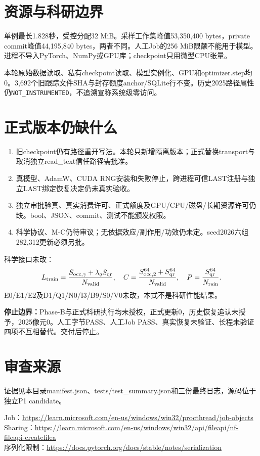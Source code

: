 \documentclass[UTF8,a4paper,10pt]{ctexart}
\begin{document}
\newpage
\section*{资源与科研边界}
单例最长1.828秒，受控分配32 MiB。采样工作集峰值53,350,400 bytes，private commit峰值44,195,840 bytes，两者不同。人工Job的256 MiB限额不能用于模型。进程不导入PyTorch、NumPy或GPU库；checkpoint只用微型CPU张量。

本轮原始数据读取、私有checkpoint读取、模型实例化、GPU和optimizer.step均0。3,692个旧跟踪文件SHA与封存额度anchor/SQLite行不变。历史2025路径属性仍\texttt{NOT\_INSTRUMENTED}，不追溯宣称系统级零访问。

\section*{正式版本仍缺什么}
\begin{enumerate}
\item 旧checkpoint仍有路径重开写法。本轮只新增隔离版本；正式替换transport与取消独立read\_text信任路径需批准。
\item 真模型、AdamW、CUDA RNG安装和失败停止，跨进程可信LAST注册与独立LAST绑定恢复决定仍未真实验收。
\item 独立审批验真、真实消费许可、正式额度及GPU/CPU/磁盘/长期资源许可仍缺。bool、JSON、commit、测试不能颁发权限。
\item 科学协议、M-C仍待审议；无依据效应/副作用/功效仍未定。seed2026六组282,312更新必须另批。
\end{enumerate}

科学接口未改：
\[
L_{\rm train}=\frac{S_{\rm occ,\gamma}+\lambda_q S_{\rm qr}}{N_{\rm valid}},\quad
C=\frac{S_{\rm occ,2}^{64}+S_{\rm qr}^{64}}{N_{\rm valid}},\quad
P=\frac{S_{\rm qr}^{64}}{N_{\rm rain}}.
\]
E0/E1/E2及D1/Q1/N0/I3/B9/S0/V0未改，本式不是科研性能结果。

\textbf{停止边界：}Phase-B与正式科研执行均未授权，正式更新0，历史恢复追认未授予，2025像元0。人工字节PASS、人工Job PASS、真实恢复未验证、长程未验证四项不互相替代。交付后停止。

\section*{审查来源}
证据见本目录manifest.json、tests/test\_summary.json和三份最终日志，源码位于独立P1 candidate。

{\footnotesize
Job：\url{https://learn.microsoft.com/en-us/windows/win32/procthread/job-objects}\\
Sharing：\url{https://learn.microsoft.com/en-us/windows/win32/api/fileapi/nf-fileapi-createfilea}\\
序列化限制：\url{https://docs.pytorch.org/docs/stable/notes/serialization}
}
\end{document}
